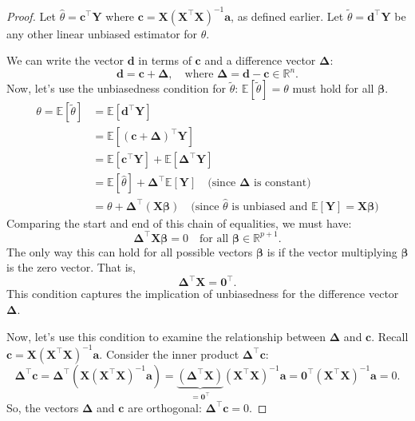 \documentclass[11pt, letterpaper]{article}
\theoremstyle{plain} %
\theoremstyle{definition} %
\theoremstyle{remark} %
\renewcommand{\mathbf}{\boldsymbol} %
\newcommand{\R}{\mathbb{R}}
\newcommand{\E}{\mathbb{E}}
\begin{document}
\begin{proof}
Let $\hat{\theta} = \boldsymbol{c}^{\top}\boldsymbol{Y}$ where $\boldsymbol{c} = \boldsymbol{X}(\boldsymbol{X}^{\top}\boldsymbol{X})^{-1}\boldsymbol{a}$, as defined earlier.
Let $\tilde{\theta} = \boldsymbol{d}^{\top}\boldsymbol{Y}$ be any other linear unbiased estimator for $\theta$.

We can write the vector $\boldsymbol{d}$ in terms of $\boldsymbol{c}$ and a difference vector $\boldsymbol{\Delta}$:
\[
\boldsymbol{d} = \boldsymbol{c} + \boldsymbol{\Delta}, \quad \text{where } \boldsymbol{\Delta} = \boldsymbol{d} - \boldsymbol{c} \in \R^n.
\]
Now, let's use the unbiasedness condition for $\tilde{\theta}$: $\E[\tilde{\theta}] = \theta$ must hold for all $\boldsymbol{\beta}$.
\begin{align*}
\theta = \E[\tilde{\theta}] &= \E[\boldsymbol{d}^{\top}\boldsymbol{Y}] \\
&= \E[(\boldsymbol{c} + \boldsymbol{\Delta})^{\top}\boldsymbol{Y}] \\
&= \E[\boldsymbol{c}^{\top}\boldsymbol{Y}] + \E[\boldsymbol{\Delta}^{\top}\boldsymbol{Y}] \\
&= \E[\hat{\theta}] + \boldsymbol{\Delta}^{\top}\E[\boldsymbol{Y}] \quad \text{(since } \boldsymbol{\Delta} \text{ is constant)} \\
&= \theta + \boldsymbol{\Delta}^{\top}(\boldsymbol{X}\boldsymbol{\beta}) \quad \text{(since } \hat{\theta} \text{ is unbiased and } \E[\boldsymbol{Y}]=\boldsymbol{X}\boldsymbol{\beta})
\end{align*}
Comparing the start and end of this chain of equalities, we must have:
\[
\boldsymbol{\Delta}^{\top} \boldsymbol{X} \boldsymbol{\beta} = 0 \quad \text{for all } \boldsymbol{\beta} \in \R^{p+1}.
\]
The only way this can hold for all possible vectors $\boldsymbol{\beta}$ is if the vector multiplying $\boldsymbol{\beta}$ is the zero vector. That is,
\begin{equation} \label{eq:delta_transpose_X_zero}
\boldsymbol{\Delta}^{\top} \boldsymbol{X} = \mathbf{0}^{\top}.
\end{equation}
This condition captures the implication of unbiasedness for the difference vector $\boldsymbol{\Delta}$.

Now, let's use this condition to examine the relationship between $\boldsymbol{\Delta}$ and $\boldsymbol{c}$. Recall $\boldsymbol{c} = \boldsymbol{X}(\boldsymbol{X}^{\top}\boldsymbol{X})^{-1}\boldsymbol{a}$. Consider the inner product $\boldsymbol{\Delta}^{\top}\boldsymbol{c}$:
\[
\boldsymbol{\Delta}^{\top} \boldsymbol{c} = \boldsymbol{\Delta}^{\top} \left( \boldsymbol{X} (\boldsymbol{X}^{\top}\boldsymbol{X})^{-1} \boldsymbol{a} \right) = \underbrace{(\boldsymbol{\Delta}^{\top} \boldsymbol{X})}_{=\mathbf{0}^{\top}} (\boldsymbol{X}^{\top}\boldsymbol{X})^{-1} \boldsymbol{a} = \mathbf{0}^{\top} (\boldsymbol{X}^{\top}\boldsymbol{X})^{-1} \boldsymbol{a} = 0.
\]
So, the vectors $\boldsymbol{\Delta}$ and $\boldsymbol{c}$ are orthogonal: $\boldsymbol{\Delta}^{\top}\boldsymbol{c} = 0$.


\end{proof}
\end{document}
